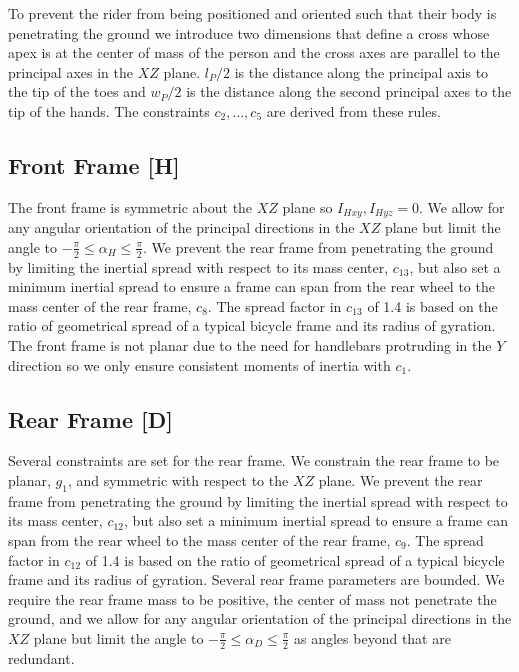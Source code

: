 \documentclass{bmd2019p}
\begin{document}
To prevent the rider from being positioned and oriented such that their body is
penetrating the ground we introduce two dimensions that define a cross whose
apex is at the center of mass of the person and the cross axes are parallel to
the principal axes in the $XZ$ plane. $l_P / 2$ is the distance along the
principal axis to the tip of the toes and $w_P / 2$ is the distance along the
second principal axes to the tip of the hands. The constraints $c_2,\ldots,c_5$
are derived from these rules.

\subsection{Front Frame [H]}
%
The front frame is symmetric about the $XZ$ plane so $I_{Hxy}, I_{Hyz} = 0$. We
allow for any angular orientation of the principal directions in the $XZ$ plane
but limit the angle to $-\frac{\pi}{2} \leq \alpha_H \leq \frac{\pi}{2}$. We
prevent the rear frame from penetrating the ground by limiting the inertial
spread with respect to its mass center, $c_{13}$, but also set a minimum
inertial spread to ensure a frame can span from the rear wheel to the mass
center of the rear frame, $c_8$. The spread factor in $c_{13}$ of 1.4 is based
on the ratio of geometrical spread of a typical bicycle frame and its radius of
gyration. The front frame is not planar due to the need for handlebars
protruding in the $Y$ direction so we only ensure consistent moments of inertia
with $c_1$.

\subsection{Rear Frame [D]}
%
Several constraints are set for the rear frame. We constrain the rear frame to
be planar, $g_1$, and symmetric with respect to the $XZ$ plane. We prevent the
rear frame from penetrating the ground by limiting the inertial spread with
respect to its mass center, $c_{12}$, but also set a minimum inertial spread to
ensure a frame can span from the rear wheel to the mass center of the rear
frame, $c_9$. The spread factor in $c_{12}$ of 1.4 is based on the ratio of
geometrical spread of a typical bicycle frame and its radius of gyration.
Several rear frame parameters are bounded. We require the rear frame mass to be
positive, the center of mass not penetrate the ground, and we allow for any
angular orientation of the principal directions in the $XZ$ plane but limit the
angle to $-\frac{\pi}{2} \leq \alpha_D \leq \frac{\pi}{2}$ as angles beyond
that are redundant.
\end{document}

